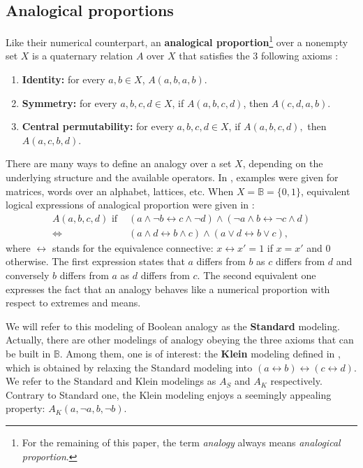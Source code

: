 \documentclass[article]{amsart}
\begin{document}
\subsection{Analogical proportions}
Like their numerical counterpart, an {\bf analogical proportion}\footnote{For
the remaining of this paper, the term {\it analogy} always means {\it
analogical proportion}.} over a nonempty set $X$ is a quaternary relation $A$
over $X$ that satisfies the 3 following axioms \cite{Dorolle49,LepageHDR2003}:
\begin{enumerate}
\item {\bf Identity:}  for every $a,b\in X$, $ A(a,b,a,b)$.
\item {\bf Symmetry:}  for every $a,b,c,d\in X$, if $ A(a,b,c,d)$, then
  $A(c,d,a,b)$.
\item {\bf Central permutability:} for every $a,b,c,d\in X$, if $  A(a,b,c,d),$
  then  $A(a,c,b,d)$.
\end{enumerate}
There are many ways to define an analogy over a set $X$, depending on the
underlying structure and the available operators.
In \cite{MicDelIRISA2004,StrYvoReport2005,MicBayDelJAIR2008}, examples
were given for matrices, words over an alphabet, lattices, etc. 
When
$X=\mathbb{B}=\{0,1\}$, equivalent logical expressions of analogical proportion
were given in \cite{MicPraECSQARU2009,PraRicLU2013}:
\begin{align*}
  A(a, b, c, d) \mbox {  if  } &(a \wedge \neg b \leftrightarrow c \wedge \neg d) \wedge ( \neg
  a \wedge b \leftrightarrow \neg c \wedge d)\\
  \iff &(a \wedge d \leftrightarrow b \wedge c) \wedge (a \vee  d \leftrightarrow b \vee c),
\end{align*}
where $\leftrightarrow $ stands for the equivalence connective: $x
\leftrightarrow x' = 1$ if $x = x'$ and $0$ otherwise. The first
expression states that $a$ differs from $b$ as $c$ differs from $d$ and
conversely $b$ differs from $a$ as $d$ differs from $c$. The second equivalent
one expresses the fact that an analogy behaves like a numerical proportion with
respect to extremes and means.

We will refer to this modeling of Boolean analogy as the \textbf{Standard}
modeling.  Actually, there are other modelings of analogy obeying the three
axioms that can be built in $\mathbb{B}$. Among them, one is of interest: the
\textbf{Klein} modeling defined in \cite{Klein1983}, which is obtained by
relaxing the Standard modeling into $(a \leftrightarrow b)\leftrightarrow(c
\leftrightarrow d)$. We refer to the Standard and Klein modelings as $A_S$ and
$A_K$ respectively. Contrary to Standard one, the Klein modeling enjoys a
seemingly appealing property: $A_K(a, \neg a, b, \neg b)$.
\end{document}
